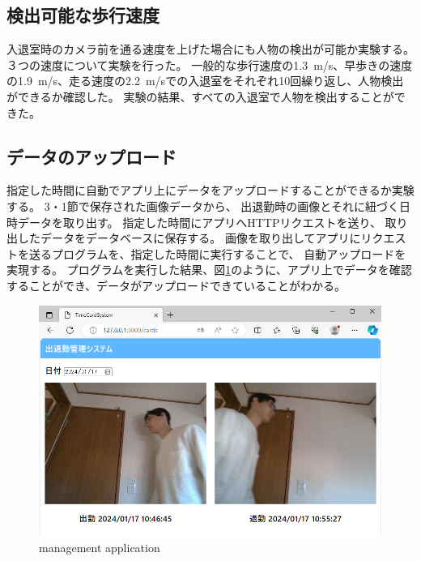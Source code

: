 \documentclass[10pt]{jarticle}
\begin{document}
    \subsection{検出可能な歩行速度}
    入退室時のカメラ前を通る速度を上げた場合にも人物の検出が可能か実験する。
    ３つの速度について実験を行った。
    一般的な歩行速度の1.3~m/s、早歩きの速度の1.9~m/s、走る速度の2.2~m/sでの入退室をそれぞれ10回繰り返し、人物検出ができるか確認した。 
    実験の結果、すべての入退室で人物を検出することができた。


    \subsection{データのアップロード}

指定した時間に自動でアプリ上にデータをアップロードすることができるか実験する。
3・1節で保存された画像データから、
出退勤時の画像とそれに紐づく日時データを取り出す。
指定した時間にアプリへHTTPリクエストを送り、
取り出したデータをデータベースに保存する。
画像を取り出してアプリにリクエストを送るプログラムを、指定した時間に実行することで、
自動アップロードを実現する。
プログラムを実行した結果、図\ref{application}のように、アプリ上でデータを確認することができ、データがアップロードできていることがわかる。
\begin{figure}[!h]
    \centering
    \includegraphics[width=1.0\linewidth]{fig/application3.png}
    \caption{management application}
    \label{application}
    \end{figure}
\end{document}
